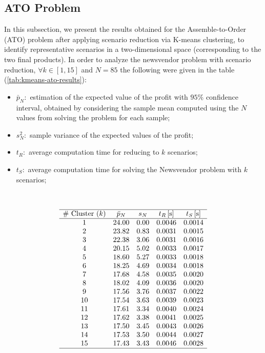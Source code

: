 \documentclass[a4paper,12pt]{article}
\begin{document}
	
	\subsection{ATO Problem}
	In this subsection, we present the results obtained for the Assemble-to-Order (ATO) problem after applying scenario reduction via K-means clustering, to identify representative scenarios in a two-dimensional space (corresponding to the two final products). In order to analyze the newsvendor problem with scenario reduction, $\forall k \in [1,15]$ and $N = 85$ the following were given in the table (\ref{tab:kmeans-ato-results}):
	\begin{itemize}
		\item $\bar{p}_{N}:$ estimation of the expected value of the profit with $95\%$ confidence interval, obtained by considering the sample mean computed using the $N$ values from solving the problem for each sample; 
		\item $s^{2}_{N}:$ sample variance of the expected values of the profit;
		\item $t_{R}:$ average computation time for reducing to $k$ scenarios;
		\item $t_{S}:$ average computation time for solving the Newsvendor problem with $k$ scenarios;
	\end{itemize}~
	
	\[
	\begin{array}{ccccc}
		\hline
		\text{\# Cluster $(k)$} & \text{$\bar{p}_{N}$} & \text{$s_{N}$} & \text{$t_{R}$\,[s]} & \text{$t_{S}$\,[s]} \\
		\hline
		1  & 24.00 & 0.00 & 0.0046 & 0.0014 \\
		2  & 23.82 & 0.83 & 0.0031 & 0.0015 \\
		3  & 22.38 & 3.06 & 0.0031 & 0.0016 \\
		4  & 20.15 & 5.02 & 0.0033 & 0.0017 \\
		5  & 18.60 & 5.27 & 0.0033 & 0.0018 \\
		6  & 18.25 & 4.69 & 0.0034 & 0.0018 \\
		7  & 17.68 & 4.58 & 0.0035 & 0.0020 \\
		8  & 18.02 & 4.09 & 0.0036 & 0.0020 \\
		9  & 17.56 & 3.76 & 0.0037 & 0.0022 \\
		10 & 17.54 & 3.63 & 0.0039 & 0.0023 \\
		11 & 17.61 & 3.34 & 0.0040 & 0.0024 \\
		12 & 17.62 & 3.38 & 0.0041 & 0.0025 \\
		13 & 17.50 & 3.45 & 0.0043 & 0.0026 \\
		14 & 17.53 & 3.50 & 0.0044 & 0.0027 \\
		15 & 17.43 & 3.43 & 0.0046 & 0.0028 \\
		\hline
	\end{array}
	\]
	
\end{document}
